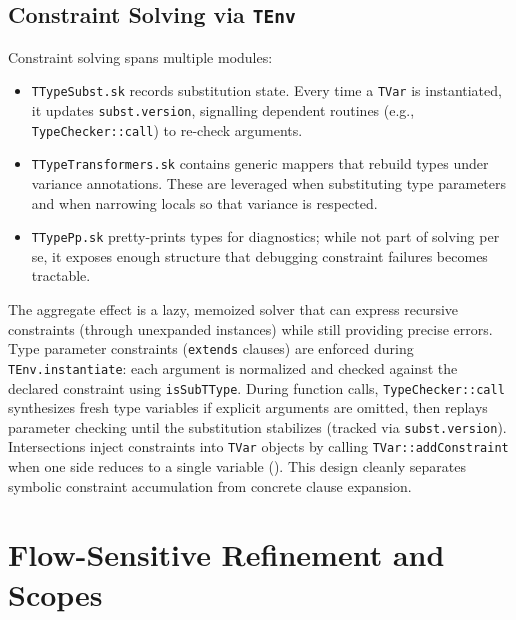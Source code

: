 \documentclass[11pt]{article}
\newcommand{\code}[1]{\path{#1}}
\begin{document}
\subsection{Constraint Solving via \texttt{TEnv}}
Constraint solving spans multiple modules:
\begin{itemize}[leftmargin=*]
  \item \texttt{TTypeSubst.sk} records substitution state. Every time a \texttt{TVar} is instantiated, it updates \texttt{subst.version}, signalling dependent routines (e.g., \texttt{TypeChecker::call}) to re-check arguments.
  \item \texttt{TTypeTransformers.sk} contains generic mappers that rebuild types under variance annotations. These are leveraged when substituting type parameters and when narrowing locals so that variance is respected.
  \item \texttt{TTypePp.sk} pretty-prints types for diagnostics; while not part of solving per se, it exposes enough structure that debugging constraint failures becomes tractable.
\end{itemize}
The aggregate effect is a lazy, memoized solver that can express recursive constraints (through unexpanded instances) while still providing precise errors.
Type parameter constraints (\texttt{extends} clauses) are enforced during \texttt{TEnv.instantiate}: each argument is normalized and checked against the declared constraint using \texttt{isSubTType}. During function calls, \texttt{TypeChecker::call} synthesizes fresh type variables if explicit arguments are omitted, then replays parameter checking until the substitution stabilizes (tracked via \texttt{subst.version}). Intersections inject constraints into \texttt{TVar} objects by calling \texttt{TVar::addConstraint} when one side reduces to a single variable (\code{src/TTypeInter.sk}). This design cleanly separates symbolic constraint accumulation from concrete clause expansion.

\section{Flow-Sensitive Refinement and Scopes}
\end{document}

